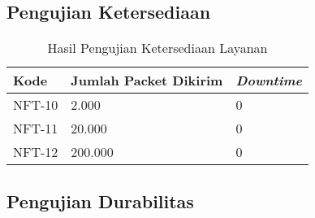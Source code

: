 \subsection{Pengujian Ketersediaan}
\begin{longtable}{|p{1.3cm}|p{4cm}|p{1.5cm}|}
	\caption{Hasil Pengujian Ketersediaan Layanan} \label{t:keandalan_ios} \\ \hline
	\rowcolor{gray!10} Kode & Jumlah Packet Dikirim & \textit{Downtime} \\ \hline
	NFT-10 & 2.000 & 0 \\ \hline
	NFT-11 & 20.000 & 0 \\ \hline
	NFT-12 & 200.000 & 0 \\ \hline
\end{longtable}

\subsection{Pengujian Durabilitas}
